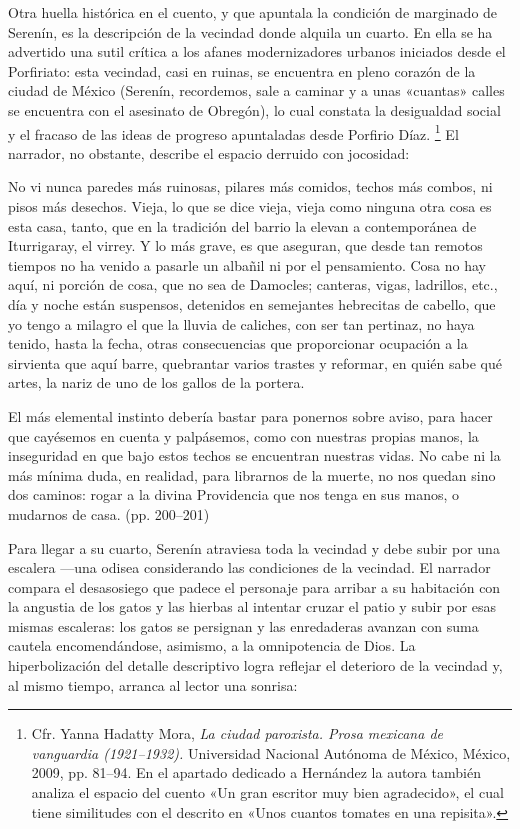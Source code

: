 \documentclass[14pt,twoside,final]{extbook} %
\let\oldfootnote\footnote
\renewcommand\footnote[1]{%
\oldfootnote{\hspace{1mm}#1}}
\begin{document}
Otra huella histórica en el cuento, y que apuntala la condición de marginado de Serenín, es la descripción de la vecindad donde alquila un cuarto. En ella se ha advertido una sutil crítica a los afanes modernizadores urbanos iniciados desde el Porfiriato: esta vecindad, casi en ruinas, se encuentra en pleno corazón de la ciudad de México (Serenín, recordemos, sale a caminar y a unas «cuantas» calles se encuentra con el asesinato de Obregón), lo cual constata la desigualdad social y el fracaso de las ideas de progreso apuntaladas desde Porfirio Díaz.\footnote{Cfr. Yanna Hadatty Mora, \emph{La ciudad paroxista. Prosa mexicana de vanguardia (1921--1932).} Universidad Nacional Autónoma de México, México, 2009, pp. 81--94. En el apartado dedicado a Hernández la autora también analiza el espacio del cuento «Un gran escritor muy bien agradecido», el cual tiene similitudes con el descrito en «Unos cuantos tomates en una repisita».} El narrador, no obstante, describe el espacio derruido con jocosidad:
\begin{quoting}
No vi nunca paredes más ruinosas, pilares más comidos, techos más combos, ni pisos más desechos. Vieja, lo que se dice vieja, vieja como ninguna otra cosa es esta casa, tanto, que en la tradición del barrio la elevan a contemporánea de Iturrigaray, el virrey. Y lo más grave, es que aseguran, que desde tan remotos tiempos no ha venido a pasarle un albañil ni por el pensamiento. Cosa no hay aquí, ni porción de cosa, que no sea de Damocles; canteras, vigas, ladrillos, etc., día y noche están suspensos, detenidos en semejantes hebrecitas de cabello, que yo tengo a milagro el que la lluvia de caliches, con ser tan pertinaz, no haya tenido, hasta la fecha, otras consecuencias que proporcionar ocupación a la sirvienta que aquí barre, quebrantar varios trastes y reformar, en quién sabe qué artes, la nariz de uno de los gallos de la portera.

El más elemental instinto debería bastar para ponernos sobre aviso, para hacer que cayésemos en cuenta y palpásemos, como con nuestras propias manos, la inseguridad en que bajo estos techos se encuentran nuestras vidas. No cabe ni la más mínima duda, en realidad, para librarnos de la muerte, no nos quedan sino dos caminos: rogar a la divina Providencia que nos tenga en sus manos, o mudarnos de casa. (pp. 200--201)
\end{quoting}
Para llegar a su cuarto, Serenín atraviesa toda la vecindad y debe subir por una escalera ---una odisea considerando las condiciones de la vecindad. El narrador compara el desasosiego que padece el personaje para arribar a su habitación con la angustia de los gatos y las hierbas al intentar cruzar el patio y subir por esas mismas escaleras: los gatos se persignan y las enredaderas avanzan con suma cautela encomendándose, asimismo, a la omnipotencia de Dios. La hiperbolización del detalle descriptivo logra reflejar el deterioro de la vecindad y, al mismo tiempo, arranca al lector una sonrisa:
\end{document}
